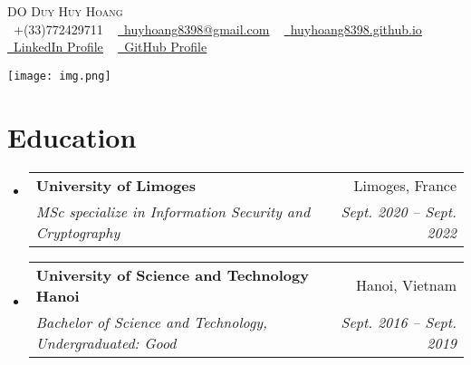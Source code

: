 \documentclass[letterpaper,11pt]{article}
\makeatletter
\newcommand{\resumeSubheading}[4]{
  \vspace{-2pt}\item
  \begin{tabular*}{0.97\textwidth}[t]{l@{\extracolsep{\fill}}r}
      \textbf{#1} & #2 \\
      \textit{\small#3} & \textit{\small #4} \\
    \end{tabular*}\vspace{-7pt}
}
\newcommand{\resumeSubHeadingListStart}{\begin{itemize}[leftmargin=0.15in, label={}]}
\newcommand{\resumeSubHeadingListEnd}{\end{itemize}}
\makeatother
\begin{document}



\begin{minipage}[t]{0.7\textwidth}
  \vspace{2pt}
  \begin{center}
    {\Huge \scshape DO Duy Huy Hoang}
    \\
    \small \raisebox{-0.1\height}\faPhone\ +(33)772429711
    ~ \href{mailto:example@examaple.com}{\raisebox{-0.2\height}\faEnvelope\  \underline{huyhoang8398@gmail.com}}
    ~ \href{https://huyhoang8398.github.io/}{\raisebox{-0.2\height}\faGlobe\ \underline{huyhoang8398.github.io}}  \vspace{2pt} \\
    \href{https://linkedin.com/in/dohoang}{\raisebox{-0.2\height}\faLinkedin\ \underline{LinkedIn Profile}}
    ~ \href{https://github.com/huyhoang8398/}{\raisebox{-0.2\height}\faGithub\ \underline{GitHub Profile}}
  \end{center}

\end{minipage}%
\begin{minipage}[t]{0.3\textwidth}
  \vspace{0pt} %
  \raggedleft %
  \texttt{[image: img.png]}
\end{minipage}


\section{Education}
  \resumeSubHeadingListStart
    \resumeSubheading
      {University of Limoges}{Limoges, France}
      {MSc specialize in Information Security and Cryptography}{Sept. 2020 -- Sept. 2022}
    \resumeSubheading
      {University of Science and Technology Hanoi}{Hanoi, Vietnam}
      {Bachelor of Science and Technology, Undergraduated: Good}{Sept. 2016 -- Sept. 2019}
  \resumeSubHeadingListEnd
\end{document}
